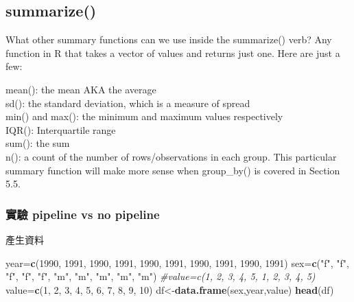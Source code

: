 \documentclass[]{book}
\newenvironment{Shaded}{\begin{snugshade}}{\end{snugshade}}
\newcommand{\CommentTok}[1]{\textcolor[rgb]{0.56,0.35,0.01}{\textit{#1}}}
\newcommand{\DecValTok}[1]{\textcolor[rgb]{0.00,0.00,0.81}{#1}}
\newcommand{\KeywordTok}[1]{\textcolor[rgb]{0.13,0.29,0.53}{\textbf{#1}}}
\newcommand{\NormalTok}[1]{#1}
\newcommand{\StringTok}[1]{\textcolor[rgb]{0.31,0.60,0.02}{#1}}
\theoremstyle{definition}
\theoremstyle{definition}
\theoremstyle{definition}
\theoremstyle{remark}
\begin{document}
\hypertarget{summarize}{%
\subsection{summarize()}\label{summarize}}

What other summary functions can we use inside the summarize() verb? Any
function in R that takes a vector of values and returns just one. Here
are just a few:

mean(): the mean AKA the average\\
sd(): the standard deviation, which is a measure of spread\\
min() and max(): the minimum and maximum values respectively\\
IQR(): Interquartile range\\
sum(): the sum\\
n(): a count of the number of rows/observations in each group. This
particular summary function will make more sense when group\_by() is
covered in Section 5.5.

\hypertarget{-pipeline-vs-no-pipeline}{%
\subsubsection{實驗 pipeline vs no
pipeline}\label{-pipeline-vs-no-pipeline}}

產生資料

\begin{Shaded}
\begin{Highlighting}[]
\NormalTok{year=}\KeywordTok{c}\NormalTok{(}\DecValTok{1990}\NormalTok{,    }\DecValTok{1991}\NormalTok{,   }\DecValTok{1990}\NormalTok{,   }\DecValTok{1991}\NormalTok{,   }\DecValTok{1990}\NormalTok{,   }\DecValTok{1991}\NormalTok{,   }\DecValTok{1990}\NormalTok{,   }\DecValTok{1991}\NormalTok{,   }\DecValTok{1990}\NormalTok{,   }\DecValTok{1991}\NormalTok{) }
\NormalTok{sex=}\KeywordTok{c}\NormalTok{(}\StringTok{"f"}\NormalTok{,  }\StringTok{"f"}\NormalTok{,    }\StringTok{"f"}\NormalTok{,    }\StringTok{"f"}\NormalTok{,    }\StringTok{"f"}\NormalTok{,    }\StringTok{"m"}\NormalTok{,    }\StringTok{"m"}\NormalTok{,    }\StringTok{"m"}\NormalTok{,    }\StringTok{"m"}\NormalTok{,    }\StringTok{"m"}\NormalTok{)}
\CommentTok{#value=c(1, 2,  3,  4,  5,  1,  2,  3,  4,  5)}
\NormalTok{value=}\KeywordTok{c}\NormalTok{(}\DecValTok{1}\NormalTok{,  }\DecValTok{2}\NormalTok{,  }\DecValTok{3}\NormalTok{,  }\DecValTok{4}\NormalTok{,  }\DecValTok{5}\NormalTok{,  }\DecValTok{6}\NormalTok{,  }\DecValTok{7}\NormalTok{,  }\DecValTok{8}\NormalTok{,  }\DecValTok{9}\NormalTok{,  }\DecValTok{10}\NormalTok{)}
\NormalTok{df<-}\KeywordTok{data.frame}\NormalTok{(sex,year,value)}
\KeywordTok{head}\NormalTok{(df)}
\end{Highlighting}
\end{Shaded}
\end{document}
